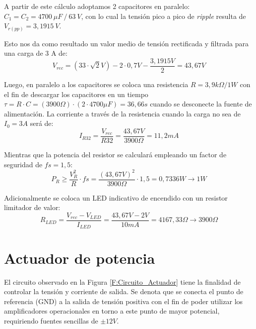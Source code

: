 A partir de este cálculo adoptamos 2 capacitores en paralelo: $C_1 =C_2 =4700~\mu F~/~63~V$, con lo cual la tensión pico a pico de \textit{ripple} resulta de  $V_{r(pp)} =3,1915~V$. \par 

Esto nos da como resultado un valor medio de tensión rectificada y filtrada para una carga de 3 A de: 
\begin{equation}
V_{rec} =(33\cdot \sqrt{2}V)-2\cdot 0,7V-\frac{3,1915V}{2}=43,67V
\end{equation} \par 

Luego, en paralelo a los capacitores se coloca una resistencia $R=3,9k\Omega /1W$ con el fin de descargar los capacitores en un tiempo $\tau =R\cdot C=(3900\Omega )\cdot (2\cdot 4700\mu F)=36,66s$ cuando se desconecte la fuente de alimentación. La corriente a través de la resistencia cuando la carga no sea de $I_0 =3A$ será de:
\begin{equation}
I_{R32} =\frac{V_{rec} }{R32}=\frac{43,67V}{3900\Omega }=11,2mA
\end{equation}\par 

Mientras que la potencia del resistor se calculará empleando un factor de seguridad de $fs=1,5$: 
\begin{equation}
P_R \ge \frac{V_R^2 }{R}\cdot fs=\frac{(43,67V)^2 }{3900\Omega }\cdot 1,5=0,7336W\to 1W
\end{equation} \par 

Adicionalmente se coloca un LED indicativo de encendido con un resistor limitador de valor: 
\begin{equation}
R_{LED} =\frac{V_{rec} -V_{LED} }{I_{LED} }=\frac{43,67V-2V}{10mA}=4167,33\Omega \to 3900\Omega
\end{equation} \par 

\section{Actuador de potencia} \par 

El circuito observado en la Figura \ref{F:Circuito_Actuador} tiene la finalidad de controlar la tensión y corriente de salida. Se denota que se conecta el punto de referencia (GND) a la salida de tensión positiva con el fin de poder utilizar los amplificadores operacionales en torno a este punto de mayor potencial, requiriendo fuentes sencillas de $\pm12V$.

